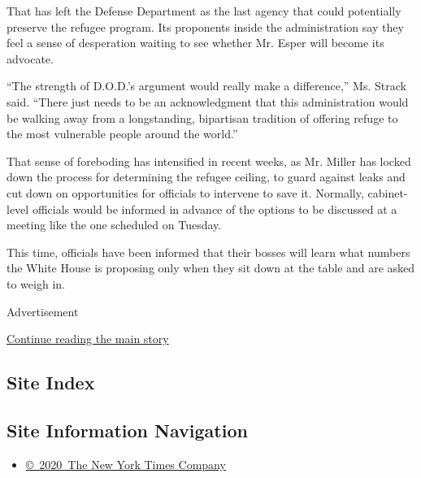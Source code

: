 That has left the Defense Department as the last agency that could
potentially preserve the refugee program. Its proponents inside the
administration say they feel a sense of desperation waiting to see
whether Mr. Esper will become its advocate.

``The strength of D.O.D.'s argument would really make a difference,''
Ms. Strack said. ``There just needs to be an acknowledgment that this
administration would be walking away from a longstanding, bipartisan
tradition of offering refuge to the most vulnerable people around the
world.''

That sense of foreboding has intensified in recent weeks, as Mr. Miller
has locked down the process for determining the refugee ceiling, to
guard against leaks and cut down on opportunities for officials to
intervene to save it. Normally, cabinet-level officials would be
informed in advance of the options to be discussed at a meeting like the
one scheduled on Tuesday.

This time, officials have been informed that their bosses will learn
what numbers the White House is proposing only when they sit down at the
table and are asked to weigh in.

Advertisement

\protect\hyperlink{after-bottom}{Continue reading the main story}

\hypertarget{site-index}{%
\subsection{Site Index}\label{site-index}}

\hypertarget{site-information-navigation}{%
\subsection{Site Information
Navigation}\label{site-information-navigation}}

\begin{itemize}
\tightlist
\item
  \href{https://help.nytimes3xbfgragh.onion/hc/en-us/articles/115014792127-Copyright-notice}{©~2020~The
  New York Times Company}
\end{itemize}


